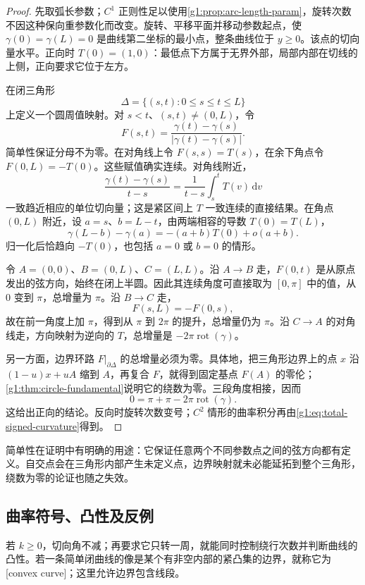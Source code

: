 \begin{proof}
	先取弧长参数；\(C^1\) 正则性足以使用\cref{g1:prop:arc-length-param}，旋转次数不因这种保向重参数化而改变。旋转、平移平面并移动参数起点，使 \(\gamma(0)=\gamma(L)=0\) 是曲线第二坐标的最小点，整条曲线位于 \(y\geq0\)。该点的切向量水平。正向时 \(T(0)=(1,0)\)：最低点下方属于无界外部，局部内部在切线的上侧，正向要求它位于左方。

	在闭三角形
	\[
		\Delta=\{(s,t):0\leq s\leq t\leq L\}
	\]
	上定义一个圆周值映射。对 \(s<t\)、\((s,t)\ne(0,L)\)，令
	\[
		F(s,t)=\frac{\gamma(t)-\gamma(s)}{|\gamma(t)-\gamma(s)|}.
	\]
	简单性保证分母不为零。在对角线上令 \(F(s,s)=T(s)\)，在余下角点令 \(F(0,L)=-T(0)\)。这些赋值确实连续。对角线附近，
	\[
		\frac{\gamma(t)-\gamma(s)}{t-s}
		=\frac1{t-s}\int_s^t T(v)\,\mathrm{d}v
	\]
	一致趋近相应的单位切向量；这是紧区间上 \(T\) 一致连续的直接结果。在角点 \((0,L)\) 附近，设 \(a=s\)、\(b=L-t\)，由两端相容的导数 \(T(0)=T(L)\)，
	\[
		\gamma(L-b)-\gamma(a)=-(a+b)T(0)+o(a+b).
	\]
	归一化后恰趋向 \(-T(0)\)，也包括 \(a=0\) 或 \(b=0\) 的情形。

	令 \(A=(0,0)\)、\(B=(0,L)\)、\(C=(L,L)\)。沿 \(A\to B\) 走，\(F(0,t)\) 是从原点发出的弦方向，始终在闭上半圆。因此其连续角度可直接取为 \([0,\pi]\) 中的值，从 \(0\) 变到 \(\pi\)，总增量为 \(\pi\)。沿 \(B\to C\) 走，
	\[
		F(s,L)=-F(0,s),
	\]
	故在前一角度上加 \(\pi\)，得到从 \(\pi\) 到 \(2\pi\) 的提升，总增量仍为 \(\pi\)。沿 \(C\to A\) 的对角线走，方向映射为逆向的 \(T\)，总增量是 \(-2\pi\operatorname{rot}(\gamma)\)。

	另一方面，边界环路 \(F|_{\partial\Delta}\) 的总增量必须为零。具体地，把三角形边界上的点 \(x\) 沿 \((1-u)x+uA\) 缩到 \(A\)，再复合 \(F\)，就得到固定基点 \(F(A)\) 的零伦；\cref{g1:thm:circle-fundamental}说明它的绕数为零。三段角度相接，因而
	\[
		0=\pi+\pi-2\pi\operatorname{rot}(\gamma).
	\]
	这给出正向的结论。反向时旋转次数变号；\(C^2\) 情形的曲率积分再由\eqref{g1:eq:total-signed-curvature}得到。
\end{proof}

简单性在证明中有明确的用途：它保证任意两个不同参数点之间的弦方向都有定义。自交点会在三角形内部产生未定义点，边界映射就未必能延拓到整个三角形，绕数为零的论证也随之失效。

\subsection{曲率符号、凸性及反例}
\label{g1:subsec:0703:03}

若 \(k\geq0\)，切向角不减；再要求它只转一周，就能同时控制绕行次数并判断曲线的凸性。若一条简单闭曲线的像是某个有非空内部的紧凸集的边界，就称它为[convex curve]；这里允许边界包含线段。


